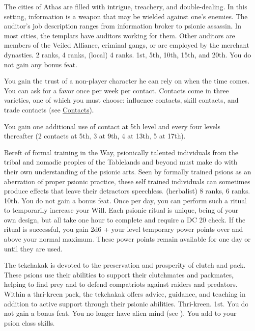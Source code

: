{The cities of Athas are filled with intrigue, treachery, and double-dealing. In this setting, information is a weapon that may be wielded against one's enemies. The auditor's job description ranges from information broker to psionic assassin. In most cities, the templars have auditors working for them. Other auditors are members of the Veiled Alliance, criminal gangs, or are employed by the merchant dynasties.}
{ 2 ranks,  4 ranks,  (local) 4 ranks.}
{1st, 5th, 10th, 15th, and 20th.}
{You do not gain any bonus feat.}
{
	You gain the trust of a non-player character he can rely on when the time comes. You can ask for a favor once per week per contact. Contacts come in three varieties, one of which you must choose: influence contacts, skill contacts, and trade contacts (see \hyperref[sec:contacts]{Contacts}).

	You gain one additional use of contact at 5th level and every four levels thereafter (2 contacts at 5th, 3 at 9th, 4 at 13th, 5 at 17th).
}
{Bereft of formal training in the Way, psionically talented individuals from the tribal and nomadic peoples of the Tablelands and beyond must make do with their own understanding of the psionic arts. Seen by formally trained psions as an aberration of proper psionic practice, these self trained individuals can sometimes produce effects that leave their detractors speechless.}
{ (herbalist) 8 ranks,  6 ranks.}
{10th.}
{You do not gain a bonus feat.}
{
	Once per day, you can perform such a ritual to temporarily increase your Will. Each psionic ritual is unique, being of your own design, but all take one hour to complete and require a DC 20  check. If the ritual is successful, you gain 2d6 + your level temporary power points over and above your normal maximum. These power points remain available for one day or until they are used.
}

{The tekchakak is devoted to the preservation and prosperity of clutch and pack. These psions use their abilities to support their clutchmates and packmates, helping to find prey and to defend compatriots against raiders and predators. Within a thri-kreen pack, the tekchakak offers advice, guidance, and teaching in addition to active support through their psionic abilities.}
{Thri-kreen.}
{1st.}
{You do not gain a bonus feat.}
{
	You no longer have alien mind (see ). You add  to your psion class skills.
}


